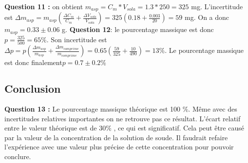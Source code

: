 \documentclass[12pt]{article}
\begin{document}
\textbf{Question 11 :} on obtient $ m_{asp}=C_m * V_{sola}=
1.3*250=325$ mg. L'incertitude est $\Delta m_{asp}=m_{asp}(\frac{\Delta C_m}{C_m}+ \frac{\Delta V_{sola}}{V_{sola}})=325(0.18+\frac{0.003}{20})=59$ mg. On a donc $m_{asp}=0.33\pm 0.06$ g. \textbf{Question 12}: le pourcentage massique est donc $p=\frac{325}{500}= 65\%$. Son incertitude est $\Delta p= p(\frac{\Delta m_{asp}}{m_{asp}}+ \frac{\Delta m_{comprime}}{m_{comprime}})=0.65(\frac{59}{325}+\frac{10}{490})=13\%$. Le pourcentage massique est donc finalement$p=0.7\pm 0.2 \%$
	
	\subsection{Conclusion}
\textbf{Question 13 :} Le pourcentage massique théorique est 100 \%. Même avec des incertitudes relatives importantes  on ne retrouve pas ce résultat. L'écart relatif entre le valeur théorique est de 30\% , ce qui est significatif. Cela peut être causé par la valeur de la concentration de la solution de soude. Il faudrait refaire l'expérience avec une valeur plus précise de cette concentration pour pouvoir conclure. 
\end{document}
